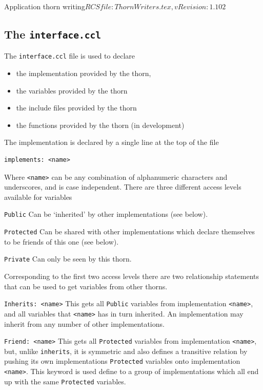 \begin{cactuspart}{2}{Application thorn writing}{$RCSfile: ThornWriters.tex,v $}{$Revision: 1.102 $}
\subsection{The {\tt interface.ccl}}

The {\tt interface.ccl} file is used to declare

\begin{itemize}
\item the implementation provided by the thorn,
\item the variables provided by the thorn
\item the include files provided by the thorn
\item the functions provided by the thorn (in development)
\end{itemize}


The implementation is declared by a single line at the top of the file
\begin{verbatim}
implements: <name>
\end{verbatim}
Where {\tt <name>} can be any combination of alphanumeric
characters and underscores, and is case independent.
There are three different access levels available for variables

\begin{Lentry}
\item[{\tt Public}]
Can be `inherited' by other implementations (see below).
\item[{\tt Protected}]
Can be shared with other implementations which declare themselves to
be friends of this one (see below).
\item[{\tt Private}]
Can only be seen by this thorn.
\end{Lentry}

Corresponding to the first two access levels there are two relationship
statements that can be used to get variables from other thorns.

\begin{Lentry}
\item [{\tt Inherits: <name>}]
This gets all {\tt Public} variables from implementation {\tt <name>}, and all
variables that {\tt <name>} has in turn inherited.
An implementation may inherit from any number of other implementations.
\item [{\tt Friend: <name>}]
This gets all {\tt Protected} variables from implementation {\tt <name>}, but,
unlike {\tt inherits}, it is symmetric and also defines a transitive relation by
pushing its own implementations {\tt Protected} variables onto implementation
{\tt <name>}.  This keyword is used define to a group of implementations which
all end up with the same {\tt Protected} variables.
\end{Lentry}


\end{cactuspart}
